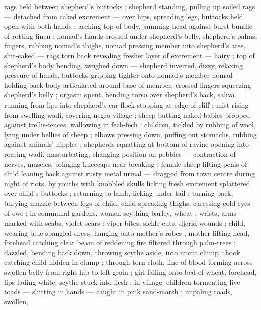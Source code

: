 rags held between shepherd's buttocks ; shepherd standing, pulling up soiled rags --- detached from
caked excrement --- over hips, spreading legs, buttocks held open with both hands ; arching top of
body, jamming head against burst bundle of rotting linen ; nomad's hands crossed under shepherd's
belly, shepherd's palms, fingers, rubbing nomad's thighs, nomad pressing member into shepherd's
arse, shit-caked --- rags torn back revealing fresher layer of excrement --- hairy ; top of
shepherd's body bending, weighed down --- shepherd inverted, dizzy, relaxing pressure of hands,
buttocks gripping tighter onto nomad's member {\dashsemi} nomad holding back body articulated around
base of member, crossed fingers squeezing shepherd's belly ; orgasm spent, bending torso over
shepherd's back, saliva running from lips into shepherd's ear  {\semislash} flock stopping at edge of cliff ; mist rising from swelling wadi,
covering negro village ; sheep butting naked babies propped against trellis-fences, wallowing in
fech-fech ; children, tickled by rubbing of wool, lying under bellies of sheep ; elbows pressing
down, puffing out stomachs, rubbing against animals' nipples ; shepherds squatting at bottom of
ravine opening into roaring wadi, masturbating, changing %
position on pebbles --- contraction of nerves, muscles, bringing kneecaps near breaking ; female
sheep lifting penis of child leaning back against rusty metal urinal --- dragged from town centre
during night of riots, by youths with knobbled skulls {\dashcom} licking fresh excrement splattered
over child's buttocks ; returning to lamb, licking under tail ; turning back, burying muzzle between
legs of child, child spreading thighs, caressing cold eyes of ewe ; in communal gardens, women
scything barley, wheat ; wrists, arms marked with scabs, violet scars : viper-bites, sickle-cuts,
djerid-wounds ; child, wearing blue-spangled dress, hanging onto mother's robes ; mother lifting
head, forehead catching clear beam of reddening fire filtered through palm-trees ; dazzled, bending
back down, throwing scythe aside, into uncut clump ; hook catching child hidden in clump ; through
torn cloth, line of blood forming across swollen belly from right hip to left groin ; girl falling
onto bed of wheat, forehead, lips fading white, scythe stuck into flesh ; in village, children
tormenting live toads --- shitting in hands --- caught in pink sand-marsh ; impaling toads, swollen,
